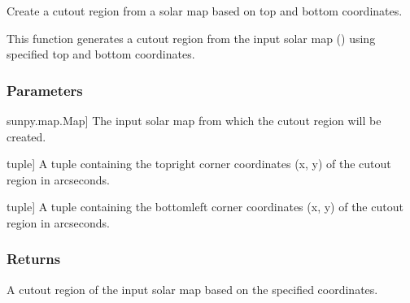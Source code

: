 \documentclass[letterpaper,10pt,english]{sphinxmanual}
\begin{document}
\begin{fulllineitems}
\label{\detokenize{pycatch/utils/ch_mapping:pycatch.utils.ch_mapping.cutout}}
\pysigstartsignatures
{}
\pysigstopsignatures
\sphinxAtStartPar
Create a cutout region from a solar map based on top and bottom coordinates.

\sphinxAtStartPar
This function generates a cutout region from the input solar map () using specified top and bottom coordinates.


\subsubsection{Parameters}
\label{\detokenize{pycatch/utils/ch_mapping:id13}}\begin{description}
\sphinxlineitem{map}{[}sunpy.map.Map{]}
\sphinxAtStartPar
The input solar map from which the cutout region will be created.

\sphinxlineitem{top}{[}tuple{]}
\sphinxAtStartPar
A tuple containing the top\sphinxhyphen{}right corner coordinates (x, y) of the cutout region in arcseconds.

\sphinxlineitem{bot}{[}tuple{]}
\sphinxAtStartPar
A tuple containing the bottom\sphinxhyphen{}left corner coordinates (x, y) of the cutout region in arcseconds.

\end{description}


\subsubsection{Returns}
\label{\detokenize{pycatch/utils/ch_mapping:id14}}\begin{description}
\sphinxAtStartPar
A cutout region of the input solar map based on the specified coordinates.

\end{description}

\end{fulllineitems}

\end{document}

